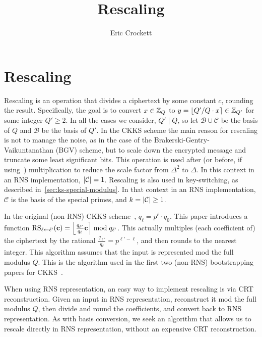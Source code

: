 \documentclass[../keyswitching.tex]{subfiles}
\title{Rescaling}
\author{Eric Crockett}
\begin{document}
	\ifcompileasbook
	\else
	\maketitle
	\listoffixmes
	\fi

\section{Rescaling}
\label{sec:rescaling}
Rescaling is an operation that divides a ciphertext by some constant $c$, rounding the result. Specifically, the goal is to convert $x\in \Z_Q$ to $y=\round{Q'/Q\cdot x}\in\Z_{Q'}$ for some integer $Q' \ge 2$. In all the cases we consider, $Q' \mid Q$, so let $\mathcal{B}\cup\mathcal{C}$ be the basis of $Q$ and $\mathcal{B}$ be the basis of $Q'$.
In the CKKS scheme the main reason for rescaling is not to manage the noise, as in the case of the Brakerski-Gentry-Vaikuntanathan (BGV) scheme, but to scale down the encrypted message and truncate some least significant bits. This operation is used after (or before, if using~\cite{cryptoeprint:2020/1118}) multiplication to reduce the scale factor from $\Delta^2$ to $\Delta$. In this context in an RNS implementation, $\abs{\mathcal{C}}=1$. Rescaling is also used in key-switching, as described in~\cref{sec:ks-special-modulus}. In that context in an RNS implementation, $\mathcal{C}$ is the basis of the special primes, and $k=\abs{\mathcal{C}}\ge 1$.

In the original (non-RNS) CKKS scheme~\cite{cryptoeprint:2016/421}, $q_\ell=p^\ell\cdot q_0$. This paper introduces a function $\mathrm{RS}_{\ell\leftarrow \ell'}(\mathbf{c}) = \round*{\frac{q_{\ell'}}{q_\ell}\mathbf{c}} \bmod q_{\ell'}$. This actually multiples (each coefficient of) the ciphertext by the rational $\frac{q_{\ell'}}{q_\ell}=p^{\ell'-\ell}$, and then rounds to the nearest integer. This algorithm assumes that the input is represented mod the full modulus $Q$. This is the algorithm used in the first two (non-RNS) bootstrapping papers for CKKS~\cite{cryptoeprint:2018/153, cryptoeprint:2018/1043}.

When using RNS representation, an easy way to implement rescaling is via CRT reconstruction. Given an input in RNS representation, reconstruct it mod the full modulus $Q$, then divide and round the coefficients, and convert back to RNS representation. As with basis conversion, we seek an algorithm that allows us to rescale directly in RNS representation, without an expensive CRT reconstruction.
\end{document}

